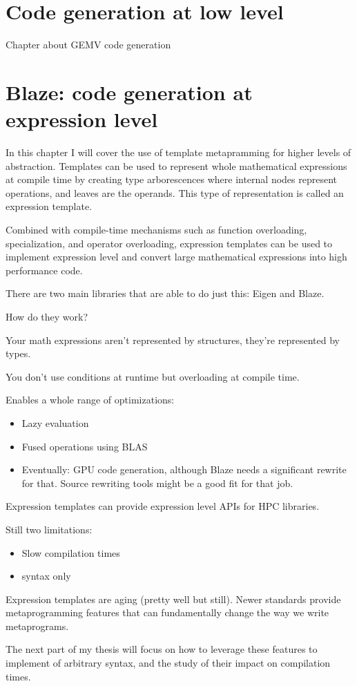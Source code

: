 \documentclass[../../main.tex]{subfiles}
\begin{document}
\chapter{Code generation at low level}

Chapter about GEMV code generation

\chapter{Blaze: code generation at expression level}

In this chapter I will cover the use of template metapramming for higher levels
of abstraction. Templates can be used to represent whole mathematical
expressions at compile time by creating type arborescences where internal
nodes represent operations, and leaves are the operands. This type of
representation is called an expression template\cite{veldhuizen:1995}.

Combined with compile-time mechanisms such as function overloading,
specialization, and operator overloading, expression templates can be used to
implement expression level \dsels and convert large mathematical expressions
into high performance code.

There are two main libraries that are able to do just this: Eigen\cite{eigen}
and Blaze\cite{blazelib}.



How do they work?

Your math expressions aren't represented by structures,
they're represented by types.

You don't use conditions at runtime but overloading at compile time.

Enables a whole range of optimizations:

\begin{itemize}
\item Lazy evaluation
\item Fused operations using BLAS
\item Eventually: GPU code generation, although Blaze needs a significant
      rewrite for that. Source rewriting tools might be a good fit for that job.
\end{itemize}

Expression templates can provide expression level APIs for HPC libraries.

Still two limitations:

\begin{itemize}
\item Slow compilation times
\item \cpp syntax only
\end{itemize}

Expression templates are aging (pretty well but still).
Newer \cpp standards provide metaprogramming features that can fundamentally
change the way we write metaprograms.

The next part of my thesis will focus on how to leverage these features to
implement \dsel of arbitrary syntax, and the study of their impact on
compilation times.
\end{document}
